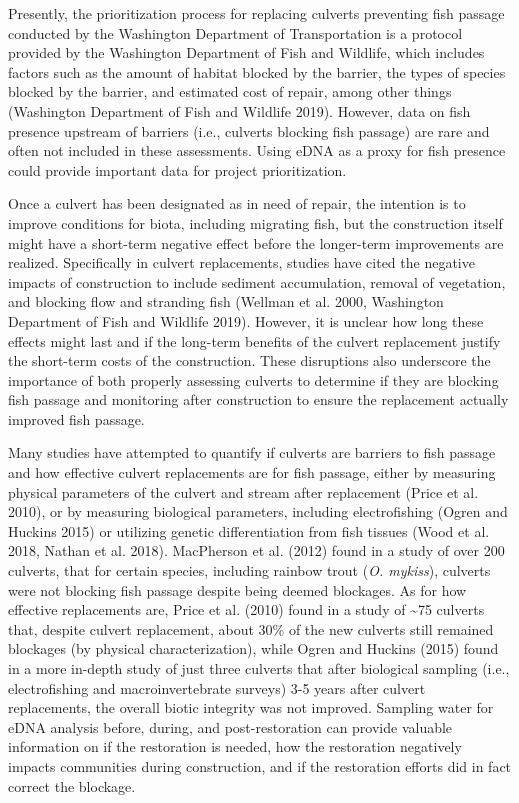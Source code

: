 \documentclass[
]{article}
\begin{document}
Presently, the prioritization process for replacing culverts preventing
fish passage conducted by the Washington Department of Transportation is
a protocol provided by the Washington Department of Fish and Wildlife,
which includes factors such as the amount of habitat blocked by the
barrier, the types of species blocked by the barrier, and estimated cost
of repair, among other things (Washington Department of Fish and
Wildlife 2019). However, data on fish presence upstream of barriers
(i.e., culverts blocking fish passage) are rare and often not included
in these assessments. Using eDNA as a proxy for fish presence could
provide important data for project prioritization.

Once a culvert has been designated as in need of repair, the intention
is to improve conditions for biota, including migrating fish, but the
construction itself might have a short-term negative effect before the
longer-term improvements are realized. Specifically in culvert
replacements, studies have cited the negative impacts of construction to
include sediment accumulation, removal of vegetation, and blocking flow
and stranding fish (Wellman et al. 2000, Washington Department of Fish
and Wildlife 2019). However, it is unclear how long these effects might
last and if the long-term benefits of the culvert replacement justify
the short-term costs of the construction. These disruptions also
underscore the importance of both properly assessing culverts to
determine if they are blocking fish passage and monitoring after
construction to ensure the replacement actually improved fish passage.

Many studies have attempted to quantify if culverts are barriers to fish
passage and how effective culvert replacements are for fish passage,
either by measuring physical parameters of the culvert and stream after
replacement (Price et al. 2010), or by measuring biological parameters,
including electrofishing (Ogren and Huckins 2015) or utilizing genetic
differentiation from fish tissues (Wood et al. 2018, Nathan et al.
2018). MacPherson et al. (2012) found in a study of over 200 culverts,
that for certain species, including rainbow trout (\emph{O. mykiss}),
culverts were not blocking fish passage despite being deemed blockages.
As for how effective replacements are, Price et al. (2010) found in a
study of \textasciitilde75 culverts that, despite culvert replacement,
about 30\% of the new culverts still remained blockages (by physical
characterization), while Ogren and Huckins (2015) found in a more
in-depth study of just three culverts that after biological sampling
(i.e., electrofishing and macroinvertebrate surveys) 3-5 years after
culvert replacements, the overall biotic integrity was not improved.
Sampling water for eDNA analysis before, during, and post-restoration
can provide valuable information on if the restoration is needed, how
the restoration negatively impacts communities during construction, and
if the restoration efforts did in fact correct the blockage.
\end{document}
